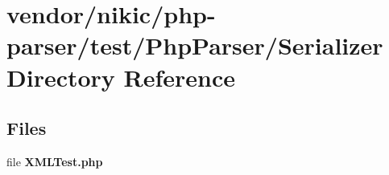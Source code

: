 \section{vendor/nikic/php-\/parser/test/\+Php\+Parser/\+Serializer Directory Reference}
\label{dir_68b99b4ac2d99d62765eb19ffbce10f2}
\subsection*{Files}
\begin{DoxyCompactItemize}
\item 
file {\bf X\+M\+L\+Test.\+php}
\end{DoxyCompactItemize}
